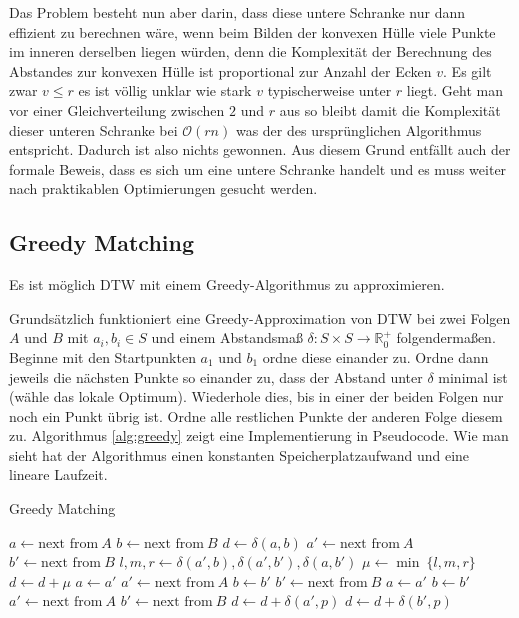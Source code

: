 Das Problem besteht nun aber darin, dass diese untere Schranke nur dann effizient zu berechnen wäre, wenn beim Bilden der konvexen Hülle viele Punkte im inneren derselben liegen würden, denn die Komplexität der Berechnung des Abstandes zur konvexen Hülle ist proportional zur Anzahl der Ecken $v$. Es gilt zwar $v \leq r$ es ist völlig unklar wie stark $v$ typischerweise unter $r$ liegt. Geht man vor einer Gleichverteilung zwischen $2$ und $r$ aus so bleibt damit die Komplexität dieser unteren Schranke bei \( \mathcal{O}(rn) \) was der des ursprünglichen Algorithmus entspricht. Dadurch ist also nichts gewonnen. Aus diesem Grund entfällt auch der formale Beweis, dass es sich um eine untere Schranke handelt und es muss weiter nach praktikablen Optimierungen gesucht werden.

\subsection{Greedy Matching} %
\label{sub:greedy}

Es ist möglich DTW mit einem Greedy-Algorithmus \cite[S.370ff.]{algorithms} zu approximieren.

Grundsätzlich funktioniert eine Greedy-Approximation von DTW bei zwei Folgen $A$ und $B$ mit \(a_i,b_i \in S\) und einem Abstandsmaß \(\delta:S\times S \rightarrow \mathbb{R}_0^+\) folgendermaßen. Beginne mit den Startpunkten $a_1$ und $b_1$ ordne diese einander zu. Ordne dann jeweils die nächsten Punkte so einander zu, dass der Abstand unter \(\delta\) minimal ist (wähle das lokale Optimum). Wiederhole dies, bis in einer der beiden Folgen nur noch ein Punkt übrig ist. Ordne alle restlichen Punkte der anderen Folge diesem zu. Algorithmus \ref{alg:greedy} zeigt eine Implementierung in Pseudocode.
Wie man sieht hat der Algorithmus einen konstanten Speicherplatzaufwand und eine lineare Laufzeit.

\begin{algorithm}
  \caption{Greedy Matching}
  \label{alg:greedy}
  \begin{algorithmic}
    \STATE $a \gets \text{next from}~A$
    \STATE $b \gets \text{next from}~B$
    \STATE $d \gets \delta(a,b)$
    \STATE $a' \gets \text{next from}~A$
    \STATE $b' \gets \text{next from}~B$
      \STATE $l, m, r \gets \delta(a',b), \delta(a', b'), \delta(a, b')$
      \STATE $\mu \gets \min ~\{l, m, r\}$
      \STATE $d \gets d + \mu$
        \STATE $a \gets a'$
        \STATE $a' \gets \text{next from}~A$
        \STATE $b \gets b'$
        \STATE $b' \gets \text{next from}~B$
      \ELSE
        \STATE $a \gets a'$
        \STATE $b \gets b'$
        \STATE $a' \gets \text{next from}~A$
        \STATE $b' \gets \text{next from}~B$
      \ENDIF
    \ENDWHILE
        \STATE $d \gets d + \delta(a',p)$
      \ENDFOR
        \STATE $d \gets d + \delta(b',p)$
      \ENDFOR
    \ENDIF
  \end{algorithmic}
\end{algorithm}

